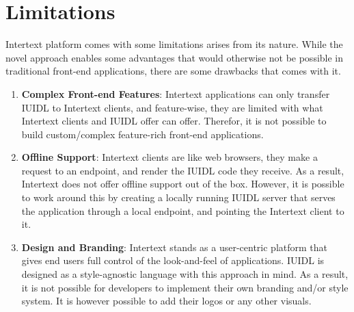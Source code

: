 \section{Limitations}

Intertext platform comes with some limitations arises from its nature. While the novel approach enables some advantages that would otherwise not be possible in traditional front-end applications, there are some drawbacks that comes with it. 

\begin{enumerate}

    \item \textbf{Complex Front-end Features}: Intertext applications can only transfer IUIDL to Intertext clients, and feature-wise, they are limited with what Intertext clients and IUIDL offer can offer. Therefor, it is not possible to build custom/complex feature-rich front-end applications.

    \item \textbf{Offline Support}: Intertext clients are like web browsers, they make a request to an endpoint, and render the IUIDL code they receive. As a result, Intertext does not offer offline support out of the box. However, it is possible to work around this by creating a locally running IUIDL server that serves the application through a local endpoint, and pointing the Intertext client to it.
    
    \item \textbf{Design and Branding}: Intertext stands as a user-centric platform that gives end users full control of the look-and-feel of applications. IUIDL is designed as a style-agnostic language with this approach in mind. As a result, it is not possible for developers to implement their own branding and/or style system. It is however possible to add their logos or any other visuals.
    

\end{enumerate}
